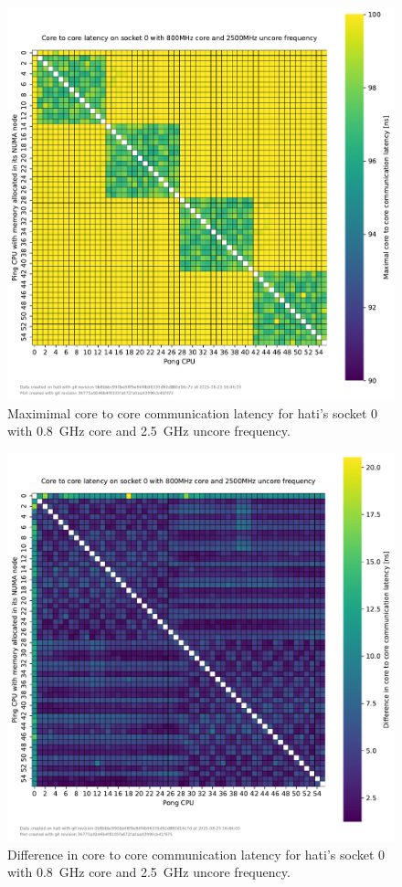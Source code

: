 \begin{figure}[]
    \centering
    \includegraphics[width=\columnwidth]{fig/core-to-core-latency/core-to-core-heatmap-max-800-2500.pdf}
    \caption{Maximimal core to core communication latency for hati's socket 0 with \SI{0.8}{\GHz} core and \SI{2.5}{\GHz} uncore frequency.}
\end{figure}
\begin{figure}[]
    \centering
    \includegraphics[width=\columnwidth]{fig/core-to-core-latency/core-to-core-heatmap-diff-800-2500.pdf}
    \caption{Difference in core to core communication latency for hati's socket 0 with \SI{0.8}{\GHz} core and \SI{2.5}{\GHz} uncore frequency.}
\end{figure}

